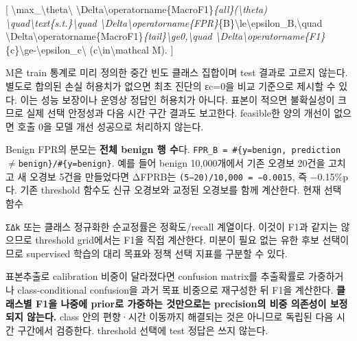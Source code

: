 [ \textbackslash{}max\_\allowbreak{}\textbackslash{}theta\textbackslash{} \textbackslash{}Delta\textbackslash{}operatorname\{MacroF1\}\emph{\{all\}(\textbackslash{}theta) \textbackslash{}quad\textbackslash{}text\{s.t.\}\textbackslash{}quad \textbackslash{}Delta\textbackslash{}operatorname\{FPR\}}\{B\}\textbackslash{}le\textbackslash{}epsilon\_\allowbreak{}B,\textbackslash{}quad \textbackslash{}Delta\textbackslash{}operatorname\{MacroF1\}\emph{\{tail\}\textbackslash{}ge0,\textbackslash{}quad \textbackslash{}Delta\textbackslash{}operatorname\{F1\}}\{c\}\textbackslash{}ge-\textbackslash{}epsilon\_\allowbreak{}c\textbackslash{} (c\textbackslash{}in\textbackslash{}mathcal M). ]

M은 train 통계로 미리 정의한 중간 빈도 클래스 집합이며 test 결과로 고르지 않는다. 별도로 합의된 손실 허용치가 없으면 최초 진단의 εc=\allowbreak{}0을 비교 기준으로 제시할 수 있다. 이는 성능 보장이나 운영상 정답인 허용치가 아니다. 표본이 적으면 불확실성이 크므로 실제 선택 안정성과 다음 시간 구간 결과도 보고한다. feasible한 양의 개선이 없으면 호출 0을 모델 개선 성공으로 처리하지 않는다.

Benign FPR의 분모는 \textbf{전체 benign 행 수}다. \texttt{FPR\_\allowbreak{}\allowbreak{}B =\allowbreak{}\allowbreak{} \allowbreak{}\#\{\allowbreak{}y=\allowbreak{}\allowbreak{}beni\allowbreak{}gn,\allowbreak{} pred\allowbreak{}iction\ensuremath{\neq}b\allowbreak{}enign\}\allowbreak{}/\allowbreak{}\allowbreak{}\#\allowbreak{}\{\allowbreak{}y=\allowbreak{}\allowbreak{}benig\allowbreak{}n\}\allowbreak{}}. 예를 들어 benign 10,000개에서 기존 오경보 20건을 고치고 새 오경보 5건을 만들었다면 ΔFPRB는 \texttt{(5−20)/\allowbreak{}\allowbreak{}1\allowbreak{}0,\allowbreak{}000 =\allowbreak{}\allowbreak{} \allowbreak{}−0.\allowbreak{}0015}, 즉 −0.15\%p다. 기존 threshold 함수도 신규 오경보와 교정된 오경보를 함께 계산한다. 현재 선택 함수

\texttt{ΣΔk} 또는 클래스 정규화한 순교정률은 정확도/\allowbreak{}recall 계열이다. 이것이 F1과 같지는 않으므로 threshold grid에서는 F1을 직접 계산한다. 미분이 필요 없는 유한 후보 선택이므로 supervised 학습의 대리 목표와 정책 선택 지표를 구분할 수 있다.

표본추출로 calibration 비중이 달라졌다면 confusion matrix를 추출확률로 가중하거나 class-conditional confusion을 과거 목표 비중으로 재구성한 뒤 F1을 계산한다. \textbf{클래스별 F1을 나중에 prior로 가중하는 것만으로는 precision의 비중 의존성이 보정되지 않는다.} class 안의 편향·시간 이동까지 해결되는 것은 아니므로 독립된 다음 시간 구간에서 검증한다. threshold 선택에 test 정답은 쓰지 않는다.

